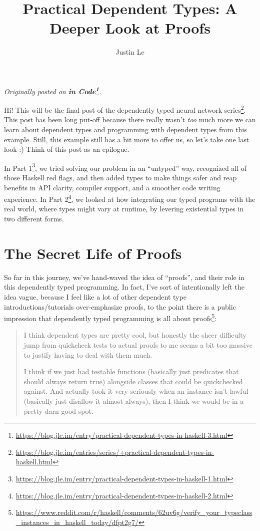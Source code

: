 \documentclass[]{article}
\title{Practical Dependent Types: A Deeper Look at Proofs}
\author{Justin Le}
\renewcommand{\href}[2]{#2\footnote{\url{#1}}}
\begin{document}
\maketitle

\emph{Originally posted on
\textbf{\href{https://blog.jle.im/entry/practical-dependent-types-in-haskell-3.html}{in
Code}}.}

Hi! This will be the final post of the
\href{https://blog.jle.im/entries/series/+practical-dependent-types-in-haskell.html}{dependently
typed neural network series}. This post has been long put-off because there
really wasn't \emph{too} much more we can learn about dependent types and
programming with dependent types from this example. Still, this example still
has a bit more to offer us, so let's take one last look :) Think of this post as
an epilogue.

In
\href{https://blog.jle.im/entry/practical-dependent-types-in-haskell-1.html}{Part
1}, we tried solving our problem in an ``untyped'' way, recognized all of those
Haskell red flags, and then added types to make things safer and reap benefits
in API clarity, compiler support, and a smoother code writing experience. In
\href{https://blog.jle.im/entry/practical-dependent-types-in-haskell-2.html}{Part
2}, we looked at how integrating our typed programs with the real world, where
types might vary at runtime, by levering existential types in two different
forms.

\section{The Secret Life of Proofs}\label{the-secret-life-of-proofs}

So far in this journey, we've hand-waved the idea of ``proofs'', and their role
in this dependently typed programming. In fact, I've sort of intentionally left
the idea vague, because I feel like a lot of other dependent type
introductions/tutorials over-emphasize proofs, to the point there is a public
impression that
\href{https://www.reddit.com/r/haskell/comments/62uv6g/verify_your_typeclass_instances_in_haskell_today/dfpt2g7/}{dependently
typed programming is all about proofs}:

\begin{quote}
I think dependent types are pretty cool, but honestly the sheer difficulty jump
from quickcheck tests to actual proofs to me seems a bit too massive to justify
having to deal with them much.

I think if we just had testable functions (basically just predicates that should
always return true) alongside classes that could be quickchecked against. And
actually took it very seriously when an instance isn't lawful (basically just
disallow it almost always), then I think we would be in a pretty darn good spot.
\end{quote}
\end{document}
